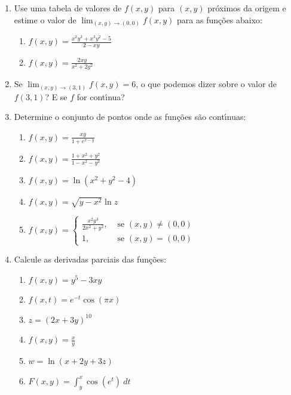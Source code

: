 \documentclass[a4paper,5pt]{amsbook}
\newcommand{\ds}{\displaystyle}
\newcommand{\ra}{\rightarrow}
\begin{document}
\vspace{1cm}
\begin{enumerate}
    \setlength\itemsep{0.5cm}
    \item Use uma tabela de valores de $f(x,y)$ para $(x,y)$ pr\'oximos da origem
    e estime o valor de $\ds\lim_{(x,y)\ra(0,0)} f(x,y)$ para as fun\c{c}\~oes
    abaixo:
        \begin{enumerate}
            \setlength\itemsep{0.2cm}
            \item $f(x,y) = \ds\frac{x^2y^3+x^3y^2-5}{2-xy}$
            \item $f(x,y) = \ds\frac{2xy}{x^2+2y^2}$
        \end{enumerate}

    \item Se $\ds\lim_{(x,y)\ra(3,1)} f(x,y) = 6$, o que podemos dizer sobre o
    valor de $f(3,1)$? E se $f$ for cont\'{\i}nua?

    \item Determine o conjunto de pontos onde as fun\c{c}\~oes s\~ao cont\'{\i}nuas:
        \begin{enumerate}
            \setlength\itemsep{0.2cm}
            \item $f(x,y) = \ds\frac{xy}{1+e^{x-y}}$
            \item $f(x,y) = \ds\frac{1+x^2+y^2}{1-x^2-y^2}$
            \item $f(x,y) = \ln{(x^2+y^2-4)}$
            \item $f(x,y) = \sqrt{y-x^2}\ln{z}$
            \item $f(x,y) = \left\{\begin{array}{cl}
                \ds\frac{x^2y^3}{2x^2+y^2}, & \text{ se } (x,y)\neq(0,0) \\
                1, & \text{ se } (x,y)=(0,0)
                \end{array}\right.$
        \end{enumerate}

    \item Calcule as derivadas parciais das fun\c{c}\~oes:
        \begin{enumerate}
            \setlength\itemsep{0.2cm}
            \item $f(x,y) = y^5-3xy$
            \item $f(x,t) = e^{-t}\cos{(\pi x)}$
            \item $z = (2x+3y)^{10}$
            \item $f(x,y) = \ds\frac{x}{y}$
            \item $w = \ln{(x+2y+3z)}$
            \item $F(x,y) = \ds\int_y^x \cos{(e^t)}\ dt$
        \end{enumerate}


\end{enumerate}
\end{document}
